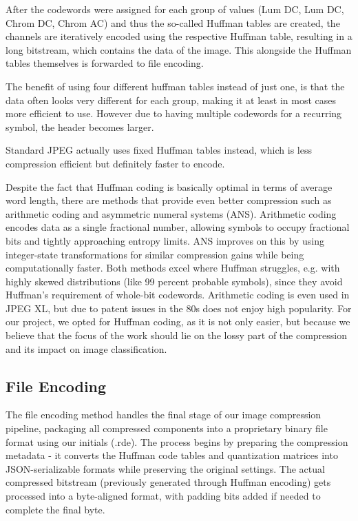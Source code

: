 After the codewords were assigned for each group of values (Lum DC, Lum DC, Chrom DC, Chrom AC) and thus the so-called Huffman tables are created, the channels are iteratively encoded using the respective Huffman table, resulting in a long bitstream, which contains the data of the image. This alongside the Huffman tables themselves is forwarded to file encoding.

The benefit of using four different huffman tables instead of just one, is that the data often looks very different for each group, making it at least in most cases more efficient to use. However due to having multiple codewords for a recurring symbol, the header becomes larger.

Standard JPEG actually uses fixed Huffman tables instead, which is less compression efficient but definitely faster to encode.

Despite the fact that Huffman coding is basically optimal in terms of average word length, there are methods that provide even better compression such as arithmetic coding and asymmetric numeral systems (ANS). Arithmetic coding encodes data as a single fractional number, allowing symbols to occupy fractional bits and tightly approaching entropy limits. ANS improves on this by using integer-state transformations for similar compression gains while being computationally faster. Both methods excel where Huffman struggles, e.g. with highly skewed distributions (like 99 percent probable symbols), since they avoid Huffman's requirement of whole-bit codewords. Arithmetic coding is even used in JPEG XL, but due to patent issues in the 80s does not enjoy high popularity. For our project, we opted for Huffman coding, as it is not only easier, but because we believe that the focus of the work should lie on the lossy part of the compression and its impact on image classification.
\subsection{File Encoding}
The file encoding method handles the final stage of our image compression pipeline, packaging all compressed components into a proprietary binary file format using our initials (.rde). The process begins by preparing the compression metadata - it converts the Huffman code tables and quantization matrices into JSON-serializable formats while preserving the original settings. The actual compressed bitstream (previously generated through Huffman encoding) gets processed into a byte-aligned format, with padding bits added if needed to complete the final byte.

